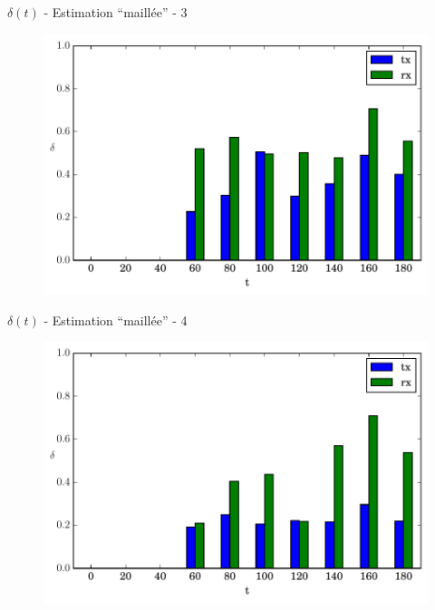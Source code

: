 \begin{frame}{$\delta(t)$ - Estimation ``maillée'' - 3}
  \begin{figure}
    \centering  
    \includegraphics[width=\textwidth]{figures/evolution_route_3.pdf}
  \end{figure}
\end{frame}

\begin{frame}{$\delta(t)$ - Estimation ``maillée'' - 4}
  \begin{figure}
    \centering  
    \includegraphics[width=\textwidth]{figures/evolution_route_4.pdf}
  \end{figure}
\end{frame}

